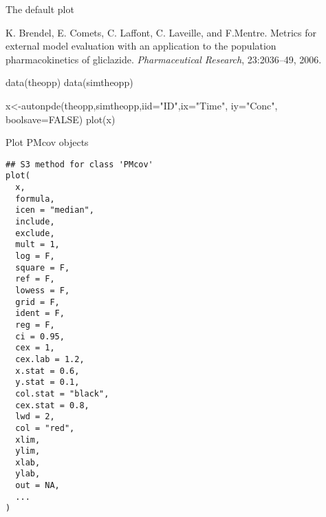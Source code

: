 \documentclass[a4paper]{book}
\begin{document}
%
\begin{Details}\relax
The default plot
\end{Details}
%
\begin{References}\relax
K. Brendel, E. Comets, C. Laffont, C. Laveille, and F.Mentre. Metrics for external model evaluation with an application to the population pharmacokinetics of gliclazide. \emph{Pharmaceutical Research}, 23:2036--49, 2006.
\end{References}
%
\begin{SeeAlso}\relax
{}
\end{SeeAlso}
%
\begin{Examples}
\begin{ExampleCode}

data(theopp)
data(simtheopp)

x<-autonpde(theopp,simtheopp,iid="ID",ix="Time", iy="Conc", boolsave=FALSE)
plot(x)

\end{ExampleCode}
\end{Examples}
%
\begin{Description}\relax
Plot PMcov objects
\end{Description}
%
\begin{Usage}
\begin{verbatim}
## S3 method for class 'PMcov'
plot(
  x,
  formula,
  icen = "median",
  include,
  exclude,
  mult = 1,
  log = F,
  square = F,
  ref = F,
  lowess = F,
  grid = F,
  ident = F,
  reg = F,
  ci = 0.95,
  cex = 1,
  cex.lab = 1.2,
  x.stat = 0.6,
  y.stat = 0.1,
  col.stat = "black",
  cex.stat = 0.8,
  lwd = 2,
  col = "red",
  xlim,
  ylim,
  xlab,
  ylab,
  out = NA,
  ...
)
\end{verbatim}
\end{Usage}
%
\end{document}

